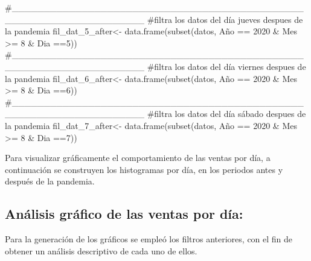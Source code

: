 \documentclass[
  us-letterpaper,
]{scrreprt}
\newenvironment{Shaded}{\begin{snugshade}}{\end{snugshade}}
\newcommand{\CommentTok}[1]{\textcolor[rgb]{0.37,0.37,0.37}{#1}}
\newcommand{\DecValTok}[1]{\textcolor[rgb]{0.68,0.00,0.00}{#1}}
\newcommand{\FunctionTok}[1]{\textcolor[rgb]{0.28,0.35,0.67}{#1}}
\newcommand{\NormalTok}[1]{\textcolor[rgb]{0.00,0.23,0.31}{#1}}
\newcommand{\OtherTok}[1]{\textcolor[rgb]{0.00,0.23,0.31}{#1}}
\newcommand{\SpecialCharTok}[1]{\textcolor[rgb]{0.37,0.37,0.37}{#1}}
\theoremstyle{definition}
\theoremstyle{plain}
\theoremstyle{plain}
\theoremstyle{remark}
\begin{document}
\begin{Shaded}
\begin{Highlighting}[]
\CommentTok{\#\_\_\_\_\_\_\_\_\_\_\_\_\_\_\_\_\_\_\_\_\_\_\_\_\_\_\_\_\_\_\_\_\_\_\_\_\_\_\_\_\_\_\_\_\_\_\_\_\_\_\_\_\_\_\_\_\_\_\_\_\_\_\_\_\_\_\_\_}
\CommentTok{\#filtra los datos del día jueves despues de la pandemia}
\NormalTok{fil\_dat\_5\_after}\OtherTok{\textless{}{-}} \FunctionTok{data.frame}\NormalTok{(}\FunctionTok{subset}\NormalTok{(datos,}
\NormalTok{                                    Año }\SpecialCharTok{==} \DecValTok{2020} \SpecialCharTok{\&}\NormalTok{ Mes }\SpecialCharTok{\textgreater{}=} \DecValTok{8} \SpecialCharTok{\&}\NormalTok{ Dia }\SpecialCharTok{==}\DecValTok{5}\NormalTok{))}
\CommentTok{\#\_\_\_\_\_\_\_\_\_\_\_\_\_\_\_\_\_\_\_\_\_\_\_\_\_\_\_\_\_\_\_\_\_\_\_\_\_\_\_\_\_\_\_\_\_\_\_\_\_\_\_\_\_\_\_\_\_\_\_\_\_\_\_\_\_\_\_\_}
\CommentTok{\#filtra los datos del día viernes despues de la pandemia}
\NormalTok{fil\_dat\_6\_after}\OtherTok{\textless{}{-}} \FunctionTok{data.frame}\NormalTok{(}\FunctionTok{subset}\NormalTok{(datos,}
\NormalTok{                                    Año }\SpecialCharTok{==} \DecValTok{2020} \SpecialCharTok{\&}\NormalTok{ Mes }\SpecialCharTok{\textgreater{}=} \DecValTok{8} \SpecialCharTok{\&}\NormalTok{ Dia }\SpecialCharTok{==}\DecValTok{6}\NormalTok{))}
\CommentTok{\#\_\_\_\_\_\_\_\_\_\_\_\_\_\_\_\_\_\_\_\_\_\_\_\_\_\_\_\_\_\_\_\_\_\_\_\_\_\_\_\_\_\_\_\_\_\_\_\_\_\_\_\_\_\_\_\_\_\_\_\_\_\_\_\_\_\_\_\_}
\CommentTok{\#filtra los datos del día sábado despues de la pandemia}
\NormalTok{fil\_dat\_7\_after}\OtherTok{\textless{}{-}} \FunctionTok{data.frame}\NormalTok{(}\FunctionTok{subset}\NormalTok{(datos,}
\NormalTok{                                    Año }\SpecialCharTok{==} \DecValTok{2020} \SpecialCharTok{\&}\NormalTok{ Mes }\SpecialCharTok{\textgreater{}=} \DecValTok{8} \SpecialCharTok{\&}\NormalTok{ Dia }\SpecialCharTok{==}\DecValTok{7}\NormalTok{))}
\end{Highlighting}
\end{Shaded}

Para visualizar gráficamente el comportamiento de las ventas por día, a
continuación se construyen los histogramas por día, en los periodos
antes y después de la pandemia.

\subsection{Análisis gráfico de las ventas por
día:}\label{anuxe1lisis-gruxe1fico-de-las-ventas-por-duxeda}

Para la generación de los gráficos se empleó los filtros anteriores, con
el fin de obtener un análisis descriptivo de cada uno de ellos.
\end{document}
